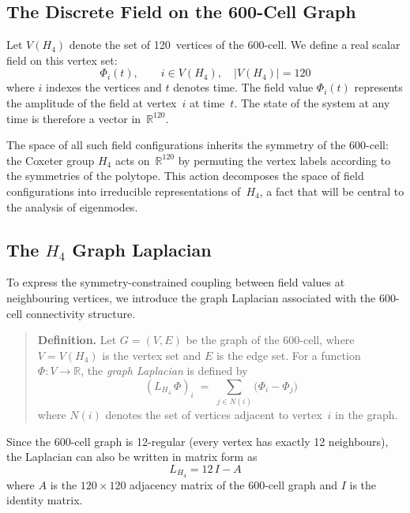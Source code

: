 \documentclass[12pt,a4paper]{article}
\newcommand{\Hfour}{H_4}
\newcommand{\Lmat}{L_{H_4}}
\newcommand{\R}{\mathbb{R}}
\begin{document}
\subsection{The Discrete Field on the 600-Cell Graph}

Let $V(\Hfour)$ denote the set of 120~vertices of the 600-cell.  We define a
real scalar field on this vertex set:
\begin{equation}\label{eq:field_disc}
  \Phi_i(t), \qquad i \in V(\Hfour),
  \quad \lvert V(\Hfour)\rvert = 120
\end{equation}
where $i$ indexes the vertices and $t$ denotes time.  The field value
$\Phi_i(t)$ represents the amplitude of the field at vertex~$i$ at time~$t$.
The state of the system at any time is therefore a vector in~$\R^{120}$.

The space of all such field configurations inherits the symmetry of the
600-cell: the Coxeter group $\Hfour$ acts on~$\R^{120}$ by permuting the
vertex labels according to the symmetries of the polytope.  This action
decomposes the space of field configurations into irreducible representations
of~$\Hfour$, a fact that will be central to the analysis of eigenmodes.

\subsection{The \texorpdfstring{$\Hfour$}{H4} Graph Laplacian}

To express the symmetry-constrained coupling between field values at
neighbouring vertices, we introduce the graph Laplacian associated with the
600-cell connectivity structure.

\begin{quote}
\textbf{Definition.}\; Let $G = (V, E)$ be the graph of the 600-cell, where
$V = V(\Hfour)$ is the vertex set and $E$ is the edge set.  For a function
$\Phi : V \to \R$, the \emph{graph Laplacian} is defined by
\begin{equation}\label{eq:laplacian}
  \boxed{(\Lmat\,\Phi)_i
    \;=\; \sum_{j \in N(i)} \bigl(\Phi_i - \Phi_j\bigr)}
\end{equation}
where $N(i)$ denotes the set of vertices adjacent to vertex~$i$ in the graph.
\end{quote}

Since the 600-cell graph is 12-regular (every vertex has exactly 12
neighbours), the Laplacian can also be written in matrix form as
\begin{equation}\label{eq:laplacian_matrix}
  \Lmat = 12\,I - A
\end{equation}
where $A$ is the $120 \times 120$ adjacency matrix of the 600-cell graph and
$I$ is the identity matrix.
\end{document}
